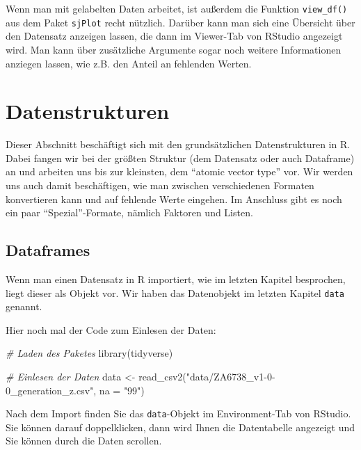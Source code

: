 \documentclass[
]{book}
\newenvironment{Shaded}{\begin{snugshade}}{\end{snugshade}}
\newcommand{\AttributeTok}[1]{\textcolor[rgb]{0.77,0.63,0.00}{#1}}
\newcommand{\CommentTok}[1]{\textcolor[rgb]{0.56,0.35,0.01}{\textit{#1}}}
\newcommand{\FunctionTok}[1]{\textcolor[rgb]{0.00,0.00,0.00}{#1}}
\newcommand{\NormalTok}[1]{#1}
\newcommand{\OtherTok}[1]{\textcolor[rgb]{0.56,0.35,0.01}{#1}}
\newcommand{\StringTok}[1]{\textcolor[rgb]{0.31,0.60,0.02}{#1}}
\begin{document}
Wenn man mit gelabelten Daten arbeitet, ist außerdem die Funktion \texttt{view\_df()} aus dem Paket \texttt{sjPlot} recht nützlich. Darüber kann man sich eine Übersicht über den Datensatz anzeigen lassen, die dann im Viewer-Tab von RStudio angezeigt wird. Man kann über zusätzliche Argumente sogar noch weitere Informationen anziegen lassen, wie z.B. den Anteil an fehlenden Werten.

\hypertarget{datenstrukturen}{%
\section{Datenstrukturen}\label{datenstrukturen}}

Dieser Abschnitt beschäftigt sich mit den grundsätzlichen Datenstrukturen in R. Dabei fangen wir bei der größten Struktur (dem Datensatz oder auch Dataframe) an und arbeiten uns bis zur kleinsten, dem ``atomic vector type'' vor. Wir werden uns auch damit beschäftigen, wie man zwischen verschiedenen Formaten konvertieren kann und auf fehlende Werte eingehen. Im Anschluss gibt es noch ein paar ``Spezial''-Formate, nämlich Faktoren und Listen.

\hypertarget{dataframes}{%
\subsection{Dataframes}\label{dataframes}}

Wenn man einen Datensatz in R importiert, wie im letzten Kapitel besprochen, liegt dieser als Objekt vor. Wir haben das Datenobjekt im letzten Kapitel \texttt{data} genannt.

Hier noch mal der Code zum Einlesen der Daten:

\begin{Shaded}
\begin{Highlighting}[]
\CommentTok{\# Laden des Paketes}
\FunctionTok{library}\NormalTok{(tidyverse)}

\CommentTok{\# Einlesen der Daten}
\NormalTok{data }\OtherTok{\textless{}{-}} \FunctionTok{read\_csv2}\NormalTok{(}\StringTok{"data/ZA6738\_v1{-}0{-}0\_generation\_z.csv"}\NormalTok{, }\AttributeTok{na =} \StringTok{"99"}\NormalTok{)}
\end{Highlighting}
\end{Shaded}

Nach dem Import finden Sie das \texttt{data}-Objekt im Environment-Tab von RStudio. Sie können darauf doppelklicken, dann wird Ihnen die Datentabelle angezeigt und Sie können durch die Daten scrollen.
\end{document}
